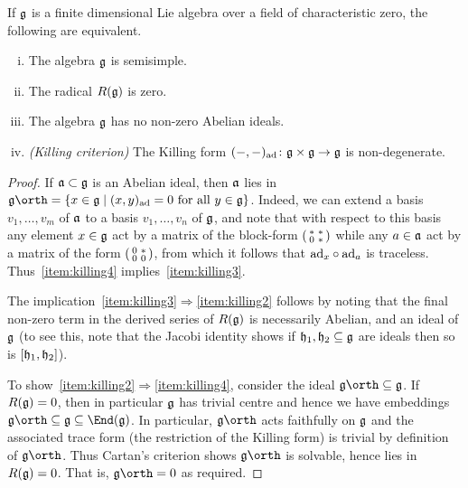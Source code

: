 \begin{theorem}
    If $\mathfrak{g}$ is a finite dimensional Lie algebra over a field of
    characteristic zero, the following are equivalent.
    \begin{enumerate}[(i)]
        \item\label{item:killing1} The algebra $\mathfrak{g}$ is semisimple.
        \item\label{item:killing2} The radical $R(\mathfrak{g})$ is zero. 
        \item\label{item:killing3} The algebra $\mathfrak{g}$ has no non-zero Abelian ideals.
        \item\label{item:killing4} \emph{(Killing criterion)} The Killing form
            $(-,-)_{\textnormal{ad}}\colon \mathfrak{g}\times \mathfrak{g}\to \mathfrak{g}$ is non-degenerate.
    \end{enumerate}

    \begin{proof}
        If $\mathfrak{a}\subset\mathfrak{g}$ is an Abelian ideal, then $\mathfrak{a}$ lies in
        $\frakg\orth=\{x\in \frakg\;|\; (x,y)_\adj = 0 \text{ for all }y\in
        \frakg\}$. Indeed, we can extend a basis $v_1,\ldots, v_m$ of $\mathfrak{a}$
        to a basis $v_1,\ldots, v_n$ of $\mathfrak{g}$, and note that with respect to
        this basis any element $x\in \mathfrak{g}$ act by a matrix of the block-form
        $\left(\begin{smallmatrix} \ast & \ast \\ 0 & \ast \end{smallmatrix}\right)$ while any $a\in \mathfrak{a}$ act by
        a matrix of the form $\left(\begin{smallmatrix} 0 & \ast \\ 0 & 0 \end{smallmatrix}\right)$, from which it follows that
        $\textnormal{ad}_x\circ \textnormal{ad}_a$ is traceless. Thus~\ref{item:killing4} implies~\ref{item:killing3}.

        The implication~\ref{item:killing3}$\Rightarrow$\ref{item:killing2}
        follows by noting that the final non-zero term in the derived series of
        $R(\mathfrak{g})$ is necessarily Abelian, and an ideal of $\mathfrak{g}$ (to see
        this, note that the Jacobi identity shows if $\mathfrak{h}_1,\mathfrak{h}_2\subseteq
        \mathfrak{g}$ are ideals then so is $[\mathfrak{h}_1,\mathfrak{h}_2]$).

        To show~\ref{item:killing2}$\Rightarrow$\ref{item:killing4}, consider
        the ideal $\frakg\orth\subseteq \frakg$. If $R(\mathfrak{g})=0$, then in
        particular $\mathfrak{g}$ has trivial centre and hence we have embeddings
        $\frakg \orth\subseteq \frakg\subseteq \End(\frakg)$. In particular,
        $\frakg \orth$ acts faithfully on $\mathfrak{g}$ and the associated trace form
        (the restriction of the Killing form) is trivial by definition of
        $\frakg\orth$. Thus Cartan's criterion shows $\frakg\orth$ is solvable,
        hence lies in $R(\mathfrak{g})=0$. That is, $\frakg\orth=0$ as required. 


\end{proof}
\end{theorem}
